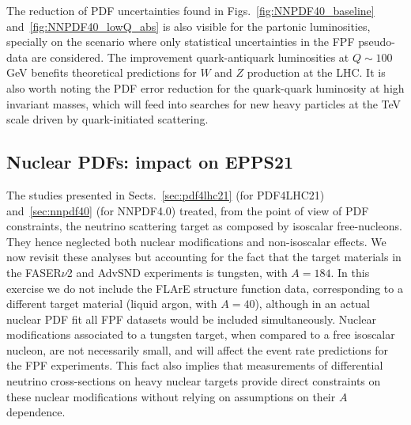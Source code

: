 The reduction of PDF uncertainties found in  Figs.~\ref{fig:NNPDF40_baseline}
and~\ref{fig:NNPDF40_lowQ_abs} is also visible
for the partonic luminosities, specially on the scenario where only statistical
uncertainties in the FPF pseudo-data are considered.
%
The improvement quark-antiquark luminosities at $Q\sim 100$ GeV
benefits theoretical predictions for $W$ and $Z$ production at the LHC.
%
It is also worth noting the PDF error reduction for the quark-quark luminosity at high invariant masses,
which will feed into searches for new heavy particles at the TeV scale driven by quark-initiated scattering.

\subsection{Nuclear PDFs: impact on EPPS21}
\label{sec:nuclearPDFs}

The studies presented in Sects.~\ref{sec:pdf4lhc21} (for PDF4LHC21)
and~\ref{sec:nnpdf40} (for NNPDF4.0) treated, from the point of view
of PDF constraints, the neutrino scattering target
as composed by isoscalar free-nucleons.
%
They hence neglected both nuclear modifications
and non-isoscalar effects.
%
We now revisit these analyses but accounting for the fact that the target materials
in the FASER$\nu$2 and AdvSND experiments is tungsten, with $A=184$.
%
In this exercise we do not include the FLArE structure function data,
corresponding to a different target material (liquid argon, with $A=40$), although
in an actual nuclear PDF fit all FPF datasets would be included simultaneously.
%
Nuclear modifications associated to a tungsten target, when compared
to a free isoscalar nucleon, are not necessarily small, and  will affect the event rate predictions for
the FPF experiments.
%
This fact also implies that  measurements of differential neutrino cross-sections
on heavy nuclear targets provide direct constraints on these nuclear modifications
without relying on assumptions on their $A$ dependence.

